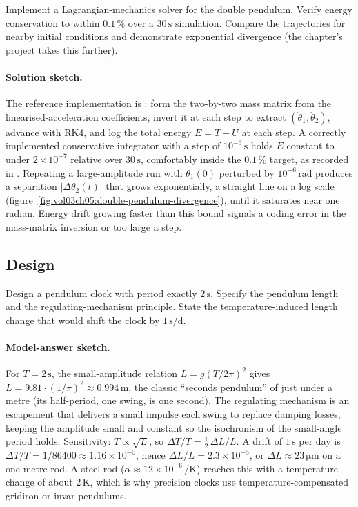 \begin{exercise}
Implement a Lagrangian-mechanics solver for the double pendulum.
Verify energy conservation to within $0.1\,\%$ over a $30\,\si{\second}$
simulation. Compare the trajectories for nearby initial conditions
and demonstrate exponential divergence (the chapter's project takes
this further).

\paragraph{Solution sketch.} The reference implementation is
: form the two-by-two mass matrix from the
linearised-acceleration coefficients, invert it at each step to extract
$(\ddot\theta_1,\ddot\theta_2)$, advance with RK4, and log the total
energy $E = T + U$ at each step. A correctly implemented conservative
integrator with a step of $10^{-3}\,\si{\second}$ holds $E$ constant to
under $2\times 10^{-7}$ relative over $30\,\si{\second}$, comfortably
inside the $0.1\,\%$ target, as recorded in
. Repeating a large-amplitude
run with $\theta_1(0)$ perturbed by $10^{-6}\,\si{\radian}$ produces a
separation $|\Delta\theta_2(t)|$ that grows exponentially, a straight
line on a log scale (figure~\ref{fig:vol03ch05:double-pendulum-divergence}),
until it saturates near one radian. Energy drift growing faster than
this bound signals a coding error in the mass-matrix inversion or too
large a step.
\end{exercise}

\subsection*{Design}

\begin{exercise}
Design a pendulum clock with period exactly $2\,\si{\second}$.
Specify the pendulum length and the regulating-mechanism principle.
State the temperature-induced length change that would shift the
clock by $1\,\si{\second\per\day}$.

\paragraph{Model-answer sketch.} For $T = 2\,\si{\second}$, the
small-amplitude relation $L = g(T/2\pi)^2$ gives $L = 9.81\cdot
(1/\pi)^2 \approx 0.994\,\si{\meter}$, the classic ``seconds pendulum''
of just under a metre (its half-period, one swing, is one second). The
regulating mechanism is an escapement that delivers a small impulse each
swing to replace damping losses, keeping the amplitude small and
constant so the isochronism of the small-angle period holds. Sensitivity:
$T\propto\sqrt L$, so $\Delta T/T = \tfrac12\,\Delta L/L$. A drift of
$1\,\si{\second}$ per day is $\Delta T/T = 1/86400 \approx
1.16\times 10^{-5}$, hence $\Delta L/L = 2.3\times 10^{-5}$, or $\Delta
L \approx 23\,\si{\micro\meter}$ on a one-metre rod. A steel rod
($\alpha \approx 12\times 10^{-6}\,\si{\per\kelvin}$) reaches this with
a temperature change of about $2\,\si{\kelvin}$, which is why precision
clocks use temperature-compensated gridiron or invar pendulums.
\end{exercise}

